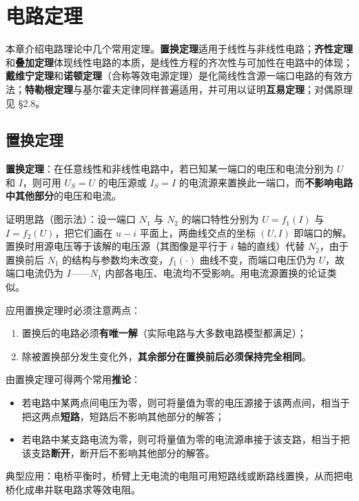 \chapter{电路定理}

\noindent
本章介绍电路理论中几个常用定理。\textbf{置换定理}适用于线性与非线性电路；\textbf{齐性定理}和\textbf{叠加定理}体现线性电路的本质，是线性方程的齐次性与可加性在电路中的体现；\textbf{戴维宁定理}和\textbf{诺顿定理}（合称等效电源定理）是化简线性含源一端口电路的有效方法；\textbf{特勒根定理}与基尔霍夫定律同样普遍适用，并可用以证明\textbf{互易定理}；对偶原理见 §2.8。

\section{置换定理}
\textbf{置换定理}：在任意线性和非线性电路中，若已知某一端口的电压和电流分别为 $U$ 和 $I$，则可用 $U_S=U$ 的电压源或 $I_S=I$ 的电流源来置换此一端口，而\textbf{不影响电路中其他部分}的电压和电流。

证明思路（图示法）：设一端口 $N_1$ 与 $N_2$ 的端口特性分别为 $U=f_1(I)$ 与 $I=f_2(U)$，把它们画在 $u-i$ 平面上，两曲线交点的坐标 $(U,I)$ 即端口的解。置换时用源电压等于该解的电压源（其图像是平行于 $i$ 轴的直线）代替 $N_2$，由于置换前后 $N_1$ 的结构与参数均未改变，$f_1(\cdot)$ 曲线不变，而端口电压仍为 $U$，故端口电流仍为 $I$——$N_1$ 内部各电压、电流均不受影响。用电流源置换的论证类似。

应用置换定理时必须注意两点：
\begin{enumerate}
  \item 置换后的电路必须\textbf{有唯一解}（实际电路与大多数电路模型都满足）；
  \item 除被置换部分发生变化外，\textbf{其余部分在置换前后必须保持完全相同}。
\end{enumerate}

由置换定理可得两个常用\textbf{推论}：
\begin{itemize}
  \item 若电路中某两点间电压为零，则可将量值为零的电压源接于该两点间，相当于把这两点\textbf{短路}，短路后不影响其他部分的解答；
  \item 若电路中某支路电流为零，则可将量值为零的电流源串接于该支路，相当于把该支路\textbf{断开}，断开后不影响其他部分的解答。
\end{itemize}
典型应用：电桥平衡时，桥臂上无电流的电阻可用短路线或断路线置换，从而把电桥化成串并联电路求等效电阻。


